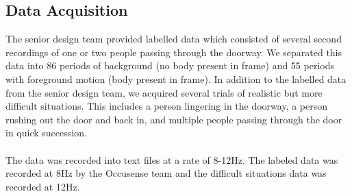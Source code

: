 \documentclass[12pt,oneside]{article} %
\begin{document}
\subsection{Data Acquisition}  %
The senior design team provided labelled data which consisted of several second recordings of 
one or two people passing through the doorway. We separated this data into 86 periods of
background (no body present in frame) and 55 periods with foreground motion (body present in frame).
In addition to the labelled data from the senior design team, we acquired several trials of realistic but more
difficult situations. This includes a person lingering in the doorway, a person rushing out the door and back in, and multiple people passing through
the door in quick succession.
\\ \\
The data was recorded into text files at a rate of 8-12Hz. The labeled data was recorded at 8Hz
by the Occusense team and the difficult situations data was recorded at 12Hz.
\end{document}
